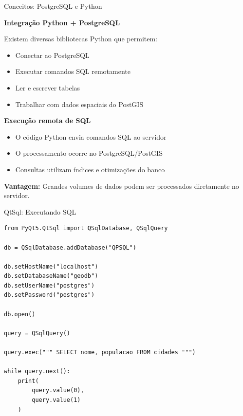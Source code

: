 \documentclass{beamer}
\begin{document}
\begin{frame}{Conceitos: PostgreSQL e Python}

\textbf{Integração Python + PostgreSQL}

\vspace{0.4cm}

Existem diversas bibliotecas Python que permitem:

\begin{itemize}
    \item Conectar ao PostgreSQL
    \item Executar comandos SQL remotamente
    \item Ler e escrever tabelas
    \item Trabalhar com dados espaciais do PostGIS
\end{itemize}

\vspace{0.4cm}

\textbf{Execução remota de SQL}

\begin{itemize}
    \item O código Python envia comandos SQL ao servidor
    \item O processamento ocorre no PostgreSQL/PostGIS
    \item Consultas utilizam índices e otimizações do banco
\end{itemize}

\vspace{0.4cm}

\textbf{Vantagem:}
Grandes volumes de dados podem ser processados diretamente no servidor.

\end{frame}

\begin{frame}[fragile]{QtSql: Executando SQL}

\begin{verbatim}
from PyQt5.QtSql import QSqlDatabase, QSqlQuery

db = QSqlDatabase.addDatabase("QPSQL")

db.setHostName("localhost")
db.setDatabaseName("geodb")
db.setUserName("postgres")
db.setPassword("postgres")

db.open()

query = QSqlQuery()

query.exec(""" SELECT nome, populacao FROM cidades """)

while query.next():
    print(
        query.value(0),
        query.value(1)
    )
\end{verbatim}

\end{frame}
\end{document}
